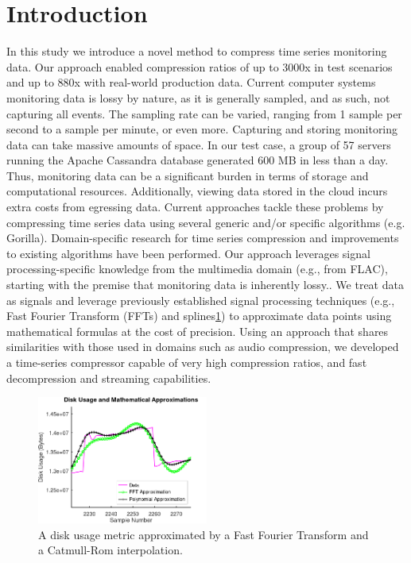 \documentclass[conference]{IEEEtran}
\begin{document}
\section{Introduction}
In this study we introduce a novel method to compress time series monitoring data\cite{influx}. 
Our approach enabled compression ratios of up to 3000x in test scenarios and up to 880x with real-world production data.
Current computer systems monitoring data is lossy by nature, as it is generally sampled, and as such, not capturing all events. The sampling rate can be varied, ranging from 1 sample per second to a sample per minute\cite{monitoring-samples}, or even more\cite{microsoft}.
Capturing and storing monitoring data can take massive amounts of space. In our test case, a group of 57 servers running the Apache Cassandra database generated 600 MB in less than a day.
Thus, monitoring data can be a significant burden in terms of storage and computational resources. Additionally, viewing data stored in the cloud incurs extra costs from egressing data.
Current approaches tackle these problems by compressing time series data using several generic and/or specific algorithms\cite{timescale}\cite{dzone}\cite{compression} (e.g. Gorilla\cite{gorilla}).
Domain-specific research for time series compression\cite{nasa-compression}\cite{smartgrid} and improvements to existing algorithms\cite{victoria} have been performed.
Our approach leverages signal processing-specific knowledge from the multimedia domain (e.g., from FLAC\cite{flac}), starting with the premise that monitoring data is inherently lossy..
We treat data as signals and leverage previously established signal processing techniques (e.g., Fast Fourier Transform (FFTs) and splines\ref{math_aprox}) to approximate data points using mathematical formulas at the cost of precision.
Using an approach that shares similarities with those used in domains such as audio compression, we developed a time-series compressor capable of very high compression ratios, and fast decompression and streaming capabilities.

\begin{figure}[ht]
  \centering
  \includegraphics[width=0.5\textwidth]{math_approximation-4.png}
  \caption{A disk usage metric approximated by a Fast Fourier Transform and a Catmull-Rom interpolation.}
  \label{math_aprox}
\end{figure}
\end{document}
